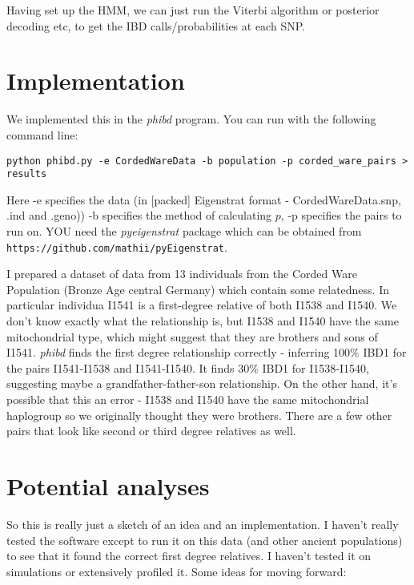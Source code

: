 \documentclass[10pt,a4]{article}
\begin{document}
Having set up the HMM, we can just run the Viterbi algorithm or posterior decoding etc, to get the IBD calls/probabilities at each SNP. 

\section{Implementation}

We implemented this in the \emph{phibd} program. You can run with the following command line:

\begin{verbatim}
python phibd.py -e CordedWareData -b population -p corded_ware_pairs > results
\end{verbatim}
Here -e specifies the data (in [packed] Eigenstrat format - CordedWareData.snp, .ind and .geno)) -b specifies the method of calculating $p$, -p specifies the pairs to run on. YOU need the \emph{pyeigenstrat} package which can be obtained from \texttt{https://github.com/mathii/pyEigenstrat}.

I prepared a dataset of data from 13 individuals from the Corded Ware Population (Bronze Age central Germany) which contain some relatedness. In particular individua I1541 is a first-degree relative of both I1538 and I1540. We don't know exactly what the relationship is, but I1538 and I1540 have the same mitochondrial type, which might suggest that they are brothers and sons of I1541. \emph{phibd} finds the first degree relationship correctly - inferring 100\% IBD1 for the pairs I1541-I1538 and I1541-I1540. It finds 30\% IBD1 for I1538-I1540, suggesting maybe a grandfather-father-son relationship. On the other hand, it's possible that this an error - I1538 and I1540 have the same mitochondrial haplogroup so we originally thought they were brothers. There are a few other pairs that look like second or third degree relatives as well. 

\section{Potential analyses}

So this is really just a sketch of an idea and an implementation. I haven't really tested the software except to run it on this data (and other ancient populations) to see that it found the correct first degree relatives. I haven't tested it on simulations or extensively profiled it. Some ideas for moving forward:
\end{document}
